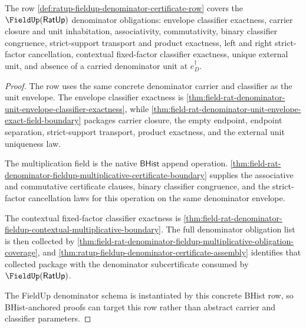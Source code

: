\begin{theorem}
\label{thm:ratup-fieldup-denominator-certificate-row-laws}
The row
\autoref{def:ratup-fieldup-denominator-certificate-row} covers the
$\FieldUp(\mathsf{RatUp})$ denominator obligations: envelope classifier
exactness, carrier closure and unit inhabitation, associativity, commutativity,
binary classifier congruence, strict-support transport and product exactness,
left and right strict-factor cancellation, contextual fixed-factor classifier
exactness, unique external unit, and absence of a carried denominator unit at
$e_D^\dagger$.
\end{theorem}
\begin{proof}
The row uses the same concrete denominator carrier and classifier as the unit
envelope. The envelope classifier exactness is
\autoref{thm:field-rat-denominator-unit-envelope-classifier-exactness}, while
\autoref{thm:field-rat-denominator-unit-envelope-exact-field-boundary} packages
carrier closure, the empty endpoint, endpoint separation, strict-support
transport, product exactness, and the external unit uniqueness law.

The multiplication field is the native $\mathsf{BHist}$ append operation.
\autoref{thm:field-rat-denominator-fieldup-multiplicative-certificate-boundary}
supplies the associative and commutative certificate clauses, binary classifier
congruence, and the strict-factor cancellation laws for this operation on the
same denominator envelope.

The contextual fixed-factor classifier exactness is
\autoref{thm:field-rat-denominator-fieldup-contextual-multiplicative-boundary}.
The full denominator obligation list is then collected by
\autoref{thm:field-rat-denominator-fieldup-multiplicative-obligation-coverage},
and
\autoref{thm:ratup-fieldup-denominator-certificate-assembly} identifies that
collected package with the denominator subcertificate consumed by
$\FieldUp(\mathsf{RatUp})$.

The FieldUp denominator schema is instantiated by this concrete BHist row, so
BHist-anchored proofs can target this row rather than abstract carrier and
classifier parameters.
\end{proof}

